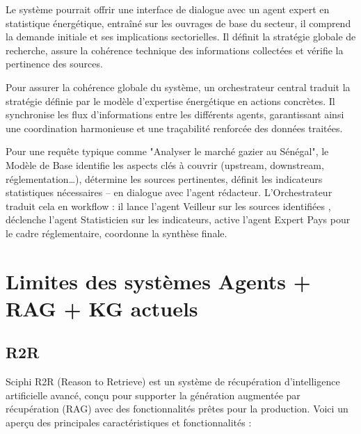 \documentclass[a4paper,11pt]{report}
\begin{document}
Le système pourrait offrir une interface de dialogue avec un agent expert en statistique énergétique, entraîné sur les ouvrages de base du secteur, il comprend la demande initiale et ses implications sectorielles. Il définit la stratégie globale de recherche, assure la cohérence technique des informations collectées et vérifie la pertinence des sources.

Pour assurer la cohérence globale du système, un orchestrateur central traduit la stratégie définie par le modèle d'expertise énergétique en actions concrètes. Il synchronise les flux d'informations entre les différents agents, garantissant ainsi une coordination harmonieuse et une traçabilité renforcée des données traitées.

Pour une requête typique comme "Analyser le marché gazier au Sénégal", le Modèle de Base identifie les aspects clés à couvrir (upstream, downstream, réglementation\ldots), détermine les sources pertinentes, définit les indicateurs statistiques nécessaires -- en dialogue avec l'agent rédacteur. L'Orchestrateur traduit cela en workflow : il lance l'agent Veilleur sur les sources identifiées , déclenche l'agent Statisticien sur les indicateurs, active l'agent Expert Pays pour le cadre réglementaire, coordonne la synthèse finale.

\section{Limites des systèmes Agents + RAG + KG actuels}\label{limites-des-systuxe8mes-agents-rag-kg-actuels}

\subsection{R2R}\label{r2r}

Sciphi R2R (Reason to Retrieve) est un système de récupération d'intelligence artificielle avancé, conçu pour supporter la génération augmentée par récupération (RAG) avec des fonctionnalités prêtes pour la production. Voici un aperçu des principales caractéristiques et fonctionnalités \citep{S95D9L3Y}:
\end{document}
